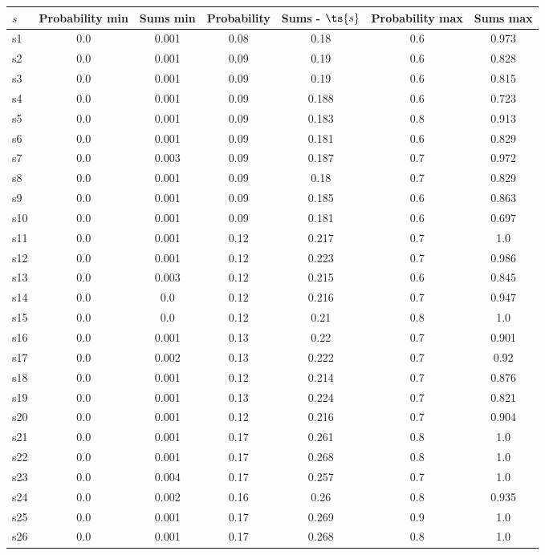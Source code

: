 \documentclass{article}
\begin{document}
\noindent\begin{tabular}{|l|c|c|c|c|c|c|}
\hline
$s$& Probability min & Sums min & Probability & Sums - $\ts{s}$ & Probability max & Sums max\\
\hline
s1 &0.0 & 0.001 & 0.08 & 0.18 & 0.6 & 0.973\\
\hline
s2 &0.0 & 0.001 & 0.09 & 0.19 & 0.6 & 0.828\\
\hline
s3 &0.0 & 0.001 & 0.09 & 0.19 & 0.6 & 0.815\\
\hline
s4 &0.0 & 0.001 & 0.09 & 0.188 & 0.6 & 0.723\\
\hline
s5 &0.0 & 0.001 & 0.09 & 0.183 & 0.8 & 0.913\\
\hline
s6 &0.0 & 0.001 & 0.09 & 0.181 & 0.6 & 0.829\\
\hline
s7 &0.0 & 0.003 & 0.09 & 0.187 & 0.7 & 0.972\\
\hline
s8 &0.0 & 0.001 & 0.09 & 0.18 & 0.7 & 0.829\\
\hline
s9 &0.0 & 0.001 & 0.09 & 0.185 & 0.6 & 0.863\\
\hline
s10 &0.0 & 0.001 & 0.09 & 0.181 & 0.6 & 0.697\\
\hline
s11 &0.0 & 0.001 & 0.12 & 0.217 & 0.7 & 1.0\\
\hline
s12 &0.0 & 0.001 & 0.12 & 0.223 & 0.7 & 0.986\\
\hline
s13 &0.0 & 0.003 & 0.12 & 0.215 & 0.6 & 0.845\\
\hline
s14 &0.0 & 0.0 & 0.12 & 0.216 & 0.7 & 0.947\\
\hline
s15 &0.0 & 0.0 & 0.12 & 0.21 & 0.8 & 1.0\\
\hline
s16 &0.0 & 0.001 & 0.13 & 0.22 & 0.7 & 0.901\\
\hline
s17 &0.0 & 0.002 & 0.13 & 0.222 & 0.7 & 0.92\\
\hline
s18 &0.0 & 0.001 & 0.12 & 0.214 & 0.7 & 0.876\\
\hline
s19 &0.0 & 0.001 & 0.13 & 0.224 & 0.7 & 0.821\\
\hline
s20 &0.0 & 0.001 & 0.12 & 0.216 & 0.7 & 0.904\\
\hline
s21 &0.0 & 0.001 & 0.17 & 0.261 & 0.8 & 1.0\\
\hline
s22 &0.0 & 0.001 & 0.17 & 0.268 & 0.8 & 1.0\\
\hline
s23 &0.0 & 0.004 & 0.17 & 0.257 & 0.7 & 1.0\\
\hline
s24 &0.0 & 0.002 & 0.16 & 0.26 & 0.8 & 0.935\\
\hline
s25 &0.0 & 0.001 & 0.17 & 0.269 & 0.9 & 1.0\\
\hline
s26 &0.0 & 0.001 & 0.17 & 0.268 & 0.8 & 1.0\\

\end{tabular}
\end{document}

